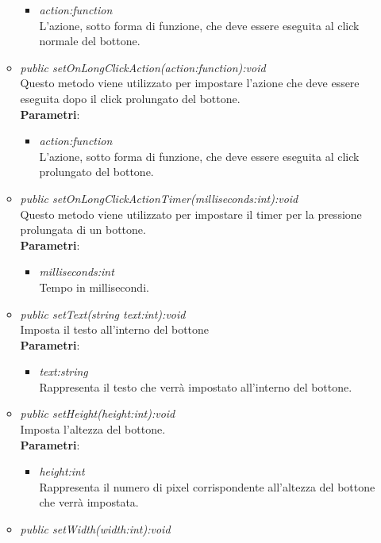 \begin{itemize}
\begin{itemize}
\begin{itemize}
		\item \textit{action:function}\\
		L'azione, sotto forma di funzione, che deve essere eseguita al click normale del bottone.
		\end{itemize}
	\item \textit{public setOnLongClickAction(action:function):void}\\
		Questo metodo viene utilizzato per impostare l'azione che deve essere eseguita dopo il click prolungato del bottone.
		\\ \textbf{Parametri}: \begin{itemize}
		\item \textit{action:function}\\
		L'azione, sotto forma di funzione, che deve essere eseguita al click prolungato del bottone.
		\end{itemize}
		\item \textit{public setOnLongClickActionTimer(milliseconds:int):void}\\
		Questo metodo viene utilizzato per impostare il timer per la pressione prolungata di un bottone.
				\\ \textbf{Parametri}: \begin{itemize}
				\item \textit{milliseconds:int}\\
				Tempo in millisecondi.
	\end{itemize}
	\item \textit{public setText(string text:int):void}\\
	Imposta il testo all'interno del bottone
		\\ \textbf{Parametri}: \begin{itemize}
		\item \textit{text:string}\\
		Rappresenta il testo che verrà impostato all'interno del bottone.
		\end{itemize}
	\item \textit{public setHeight(height:int):void}\\
	Imposta l'altezza del bottone.
		\\ \textbf{Parametri}: \begin{itemize}
		\item \textit{height:int}\\
		Rappresenta il numero di pixel corrispondente all'altezza del bottone che verrà impostata.
		\end{itemize}
	\item \textit{public setWidth(width:int):void}\\

\end{itemize}
\end{itemize}
